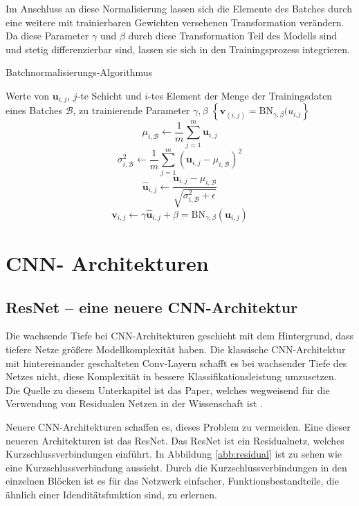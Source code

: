 Im Anschluss an diese Normalisierung lassen sich die Elemente des Batches durch eine weitere mit trainierbaren Gewichten versehenen Transformation verändern. Da diese Parameter $\gamma$ und $\beta$ durch diese Transformation Teil des Modells sind und stetig differenzierbar sind, lassen sie sich in den Trainingsprozess integrieren.

\renewcommand{\algorithmicrequire}{\textbf{Eingabe:}}
\renewcommand{\algorithmicensure}{\textbf{Ausgabe:}}


\begin{algorithm}[H]
\caption{Batchnormalisierungs-Algorithmus}
\begin{algorithmic}
\REQUIRE Werte von $\mathbf{u}_{i,j}$, $j$-te  Schicht und $i$-tes Element der Menge der Trainingsdaten  eines Batches $\mathcal{B}$, zu trainierende Parameter $\gamma, \beta$
\ENSURE $\left\{ \mathbf{v}_{(i,j)} =\text{BN}_{\gamma, \beta}(u_{i.j} \right\} $
\STATE $$\mu_{i,\mathcal{B}} \leftarrow \frac{1}{m}\sum_{j=1}^{m} \mathbf{u}_{i,j}$$
\STATE $$\sigma^2_{i,\mathcal{B}} \leftarrow \frac{1}{m} \sum_{j=1}^m \left( \mathbf{u}_{i,j} -\mu_{i,\mathcal{B}}\right)^2$$
\STATE $$ \hat{\mathbf{u}}_{i,j} \leftarrow \frac{\mathbf{u}_{i,j}-\mu_{i,\mathcal{B}}}{\sqrt{\sigma_{i,\mathcal{B}}^2+\epsilon}}$$
\STATE $$\mathbf{v}_{i,j} \leftarrow \gamma \hat{\mathbf{u}}_{i,j} + \beta  = \text{BN}_{\gamma,\beta}(\mathbf{u}_{i,j})$$
\end{algorithmic}
\label{alg:bn}
\end{algorithm}


\color{black}

\section{CNN- Architekturen}
\subsection{ResNet -- eine neuere CNN-Architektur}\label{sec:res}
Die wachsende Tiefe bei CNN-Architekturen geschieht mit dem Hintergrund, dass tiefere Netze größere Modellkomplexität haben. Die klassische CNN-Architektur mit hintereinander geschalteten Conv-Layern schafft es bei wachsender Tiefe des Netzes nicht, diese Komplexität in bessere Klassifikationsleistung umzusetzen. Die Quelle zu diesem Unterkapitel ist das Paper, welches wegweisend für die Verwendung von Residualen Netzen in der Wissenschaft ist \cite{resnet}.


Neuere CNN-Architekturen schaffen es, dieses Problem zu vermeiden. Eine dieser neueren Architekturen ist das ResNet. Das ResNet ist ein Residualnetz, welches Kurzschlussverbindungen einführt. In Abbildung \ref{abb:residual} ist zu sehen wie eine Kurzschlussverbindung aussieht. Durch die Kurzschlussverbindungen in den einzelnen Blöcken ist es für das Netzwerk einfacher, Funktionsbestandteile, die ähnlich einer Idenditätsfunktion sind, zu erlernen.   


